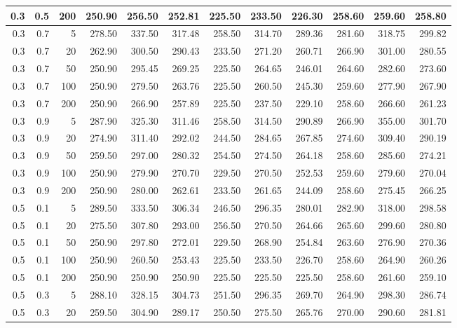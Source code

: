 \begin{longtable}{|r|r|r|r|r|r|r|r|r|r|r|r|}
		\hline
		0.3 & 0.5 & 200 & 250.90 & 256.50 & 252.81 & 225.50 & 233.50 & 226.30 & 258.60 & 259.60 & 258.80\\
		\hline
		0.3 & 0.7 & 5 & 278.50 & 337.50 & 317.48 & 258.50 & 314.70 & 289.36 & 281.60 & 318.75 & 299.82\\
		\hline
		0.3 & 0.7 & 20 & 262.90 & 300.50 & 290.43 & 233.50 & 271.20 & 260.71 & 266.90 & 301.00 & 280.55\\
		\hline
		0.3 & 0.7 & 50 & 250.90 & 295.45 & 269.25 & 225.50 & 264.65 & 246.01 & 264.60 & 282.60 & 273.60\\
		\hline
		0.3 & 0.7 & 100 & 250.90 & 279.50 & 263.76 & 225.50 & 260.50 & 245.30 & 259.60 & 277.90 & 267.90\\
		\hline
		0.3 & 0.7 & 200 & 250.90 & 266.90 & 257.89 & 225.50 & 237.50 & 229.10 & 258.60 & 266.60 & 261.23\\
		\hline
		0.3 & 0.9 & 5 & 287.90 & 325.30 & 311.46 & 258.50 & 314.50 & 290.89 & 266.90 & 355.00 & 301.70\\
		\hline
		0.3 & 0.9 & 20 & 274.90 & 311.40 & 292.02 & 244.50 & 284.65 & 267.85 & 274.60 & 309.40 & 290.19\\
		\hline
		0.3 & 0.9 & 50 & 259.50 & 297.00 & 280.32 & 254.50 & 274.50 & 264.18 & 258.60 & 285.60 & 274.21\\
		\hline
		0.3 & 0.9 & 100 & 250.90 & 279.90 & 270.70 & 229.50 & 270.50 & 252.53 & 259.60 & 279.60 & 270.04\\
		\hline
		0.3 & 0.9 & 200 & 250.90 & 280.00 & 262.61 & 233.50 & 261.65 & 244.09 & 258.60 & 275.45 & 266.25\\
		\hline
		0.5 & 0.1 & 5 & 289.50 & 333.50 & 306.34 & 246.50 & 296.35 & 280.01 & 282.90 & 318.00 & 298.58\\
		\hline
		0.5 & 0.1 & 20 & 275.50 & 307.80 & 293.00 & 256.50 & 270.50 & 264.66 & 265.60 & 299.60 & 280.80\\
		\hline
		0.5 & 0.1 & 50 & 250.90 & 297.80 & 272.01 & 229.50 & 268.90 & 254.84 & 263.60 & 276.90 & 270.36\\
		\hline
		0.5 & 0.1 & 100 & 250.90 & 260.50 & 253.43 & 225.50 & 233.50 & 226.70 & 258.60 & 264.90 & 260.26\\
		\hline
		0.5 & 0.1 & 200 & 250.90 & 250.90 & 250.90 & 225.50 & 225.50 & 225.50 & 258.60 & 261.60 & 259.10\\
		\hline
		0.5 & 0.3 & 5 & 288.10 & 328.15 & 304.73 & 251.50 & 296.35 & 269.70 & 264.90 & 298.30 & 286.74\\
		\hline
		0.5 & 0.3 & 20 & 259.50 & 304.90 & 289.17 & 250.50 & 275.50 & 265.76 & 270.00 & 290.60 & 281.81\\

\end{longtable}
